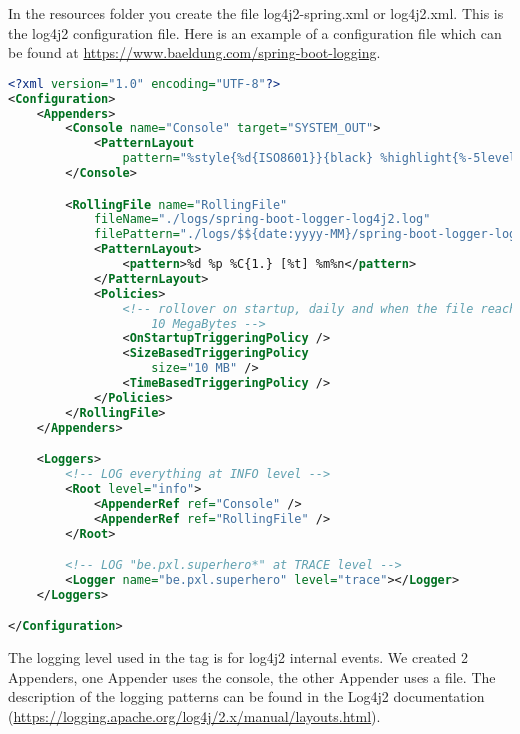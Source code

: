 In the resources folder you create the file log4j2-spring.xml or log4j2.xml. This is the log4j2 configuration file. Here is an example of a configuration file which can be found at \url{https://www.baeldung.com/spring-boot-logging}.

\begin{lstlisting}[language=xml, frame=single]
<?xml version="1.0" encoding="UTF-8"?>
<Configuration>
    <Appenders>
        <Console name="Console" target="SYSTEM_OUT">
            <PatternLayout
                pattern="%style{%d{ISO8601}}{black} %highlight{%-5level }[%style{%t}{bright,blue}] %style{%C{1.}}{bright,yellow}: %msg%n%throwable" />
        </Console>

        <RollingFile name="RollingFile"
            fileName="./logs/spring-boot-logger-log4j2.log"
            filePattern="./logs/$${date:yyyy-MM}/spring-boot-logger-log4j2-%d{-dd-MMMM-yyyy}-%i.log.gz">
            <PatternLayout>
                <pattern>%d %p %C{1.} [%t] %m%n</pattern>
            </PatternLayout>
            <Policies>
                <!-- rollover on startup, daily and when the file reaches 
                    10 MegaBytes -->
                <OnStartupTriggeringPolicy />
                <SizeBasedTriggeringPolicy
                    size="10 MB" />
                <TimeBasedTriggeringPolicy />
            </Policies>
        </RollingFile>
    </Appenders>

    <Loggers>
        <!-- LOG everything at INFO level -->
        <Root level="info">
            <AppenderRef ref="Console" />
            <AppenderRef ref="RollingFile" />
        </Root>

        <!-- LOG "be.pxl.superhero*" at TRACE level -->
        <Logger name="be.pxl.superhero" level="trace"></Logger>
    </Loggers>

</Configuration>
\end{lstlisting}

The logging level used in the tag  is for log4j2 internal events.
We created 2 Appenders, one Appender uses the console, the other Appender uses a file. 
The description of the logging patterns can be found in the Log4j2 documentation (\url{https://logging.apache.org/log4j/2.x/manual/layouts.html}).


